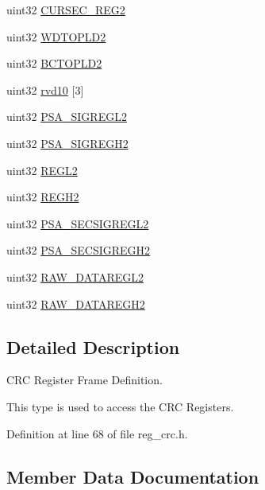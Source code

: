 \begin{DoxyCompactItemize}
\item 
uint32 \mbox{\hyperlink{structcrcBase_a10c9e4271c933101df86488902f21c2e}{C\+U\+R\+S\+E\+C\+\_\+\+R\+E\+G2}}
\item 
uint32 \mbox{\hyperlink{structcrcBase_ad00315296fe9faf382b5154dbf1ec14c}{W\+D\+T\+O\+P\+L\+D2}}
\item 
uint32 \mbox{\hyperlink{structcrcBase_a4de1ad869ff7b92f3a65a81c657d72fa}{B\+C\+T\+O\+P\+L\+D2}}
\item 
uint32 \mbox{\hyperlink{structcrcBase_a20b85e8e66bfc18edf0eb4e91fb17b5f}{rvd10}} \mbox{[}3\mbox{]}
\item 
uint32 \mbox{\hyperlink{structcrcBase_ae1a7a93f4ccf060c3085c1ec3429e23e}{P\+S\+A\+\_\+\+S\+I\+G\+R\+E\+G\+L2}}
\item 
uint32 \mbox{\hyperlink{structcrcBase_a6f256587b65b45d957871a96b23a2509}{P\+S\+A\+\_\+\+S\+I\+G\+R\+E\+G\+H2}}
\item 
uint32 \mbox{\hyperlink{structcrcBase_abaa217c05004190b7da6d2c4c9f65c89}{R\+E\+G\+L2}}
\item 
uint32 \mbox{\hyperlink{structcrcBase_ace2e4c81c9e3f65651ce6eb0e703763c}{R\+E\+G\+H2}}
\item 
uint32 \mbox{\hyperlink{structcrcBase_a31d6394e5ebba88ac4528d2efab26121}{P\+S\+A\+\_\+\+S\+E\+C\+S\+I\+G\+R\+E\+G\+L2}}
\item 
uint32 \mbox{\hyperlink{structcrcBase_a00e58cdd27092cc98137df667832ac8c}{P\+S\+A\+\_\+\+S\+E\+C\+S\+I\+G\+R\+E\+G\+H2}}
\item 
uint32 \mbox{\hyperlink{structcrcBase_aac8f543cb80c123d27f585c0bd218619}{R\+A\+W\+\_\+\+D\+A\+T\+A\+R\+E\+G\+L2}}
\item 
uint32 \mbox{\hyperlink{structcrcBase_adc245f17888da0acf6e44e37e350de88}{R\+A\+W\+\_\+\+D\+A\+T\+A\+R\+E\+G\+H2}}
\end{DoxyCompactItemize}


\subsection{Detailed Description}
C\+RC Register Frame Definition. 

This type is used to access the C\+RC Registers. 

Definition at line 68 of file reg\+\_\+crc.\+h.



\subsection{Member Data Documentation}
\mbox{\label{structcrcBase_a169322e66edb9affc7625f1d186005e5}} 
